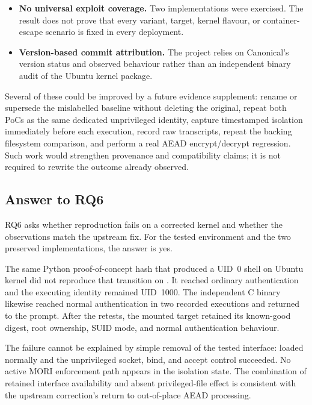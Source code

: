 \begin{itemize}
    \item \textbf{No universal exploit coverage.} Two implementations were
    exercised. The result does not prove that every variant, target, kernel
    flavour, or container-escape scenario is fixed in every deployment.

    \item \textbf{Version-based commit attribution.} The project relies on
    Canonical's version status and observed behaviour rather than an independent
    binary audit of the Ubuntu kernel package.
\end{itemize}

Several of these could be improved by a future evidence supplement: rename or
supersede the mislabelled baseline without deleting the original, repeat both
PoCs as the same dedicated unprivileged identity, capture timestamped isolation
immediately before each execution, record raw transcripts, repeat the backing
filesystem comparison, and perform a real AEAD encrypt/decrypt regression. Such
work would strengthen provenance and compatibility claims; it is not required
to rewrite the outcome already observed.

\subsection{Answer to RQ6}

RQ6 asks whether reproduction fails on a corrected kernel and whether the
observations match the upstream fix. For the tested environment and the two
preserved implementations, the answer is yes.

The same Python proof-of-concept hash that produced a UID~0 shell on Ubuntu
kernel  did not reproduce that transition on
. It reached ordinary 
authentication and the executing identity remained UID~1000. The independent C
binary likewise reached normal authentication in two recorded executions and
returned to the  prompt. After the retests, the mounted target
retained its known-good digest, root ownership, SUID mode, and normal
authentication behaviour.

The failure cannot be explained by simple removal of the tested interface:
 loaded normally and the unprivileged socket, bind, and accept
control succeeded. No active MORI enforcement path appears in the isolation
state. The combination of retained interface availability and absent
privileged-file effect is consistent with the upstream correction's return to
out-of-place AEAD processing.

